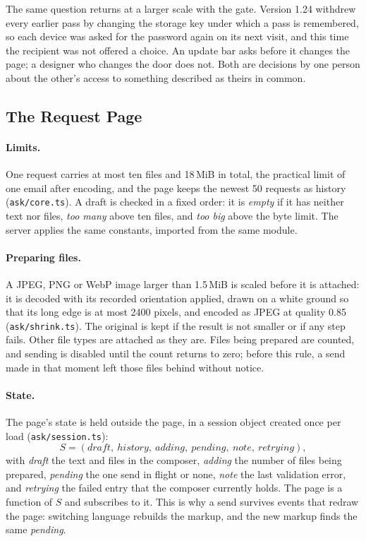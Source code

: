 \documentclass[sigconf,nonacm]{acmart}
\newcommand{\code}[1]{\textnormal{\texttt{\small #1}}}
\begin{document}
The same question returns at a larger scale with the gate. Version 1.24 withdrew every earlier
pass by changing the storage key under which a pass is remembered, so each device was asked
for the password again on its next visit, and this time the recipient was not offered a
choice. An update bar asks before it changes the page; a designer who changes the door does
not. Both are decisions by one person about the other's access to something described as
theirs in common.

\subsection{The Request Page}\label{sec:askpage}
\paragraph{Limits.}
One request carries at most ten files and 18\,MiB in total, the practical limit of one email
after encoding, and the page keeps the newest 50 requests as history
(\code{ask/core.ts}). A draft is checked in a fixed order: it is \emph{empty} if it has neither
text nor files, \emph{too many} above ten files, and \emph{too big} above the byte limit. The
server applies the same constants, imported from the same module.

\paragraph{Preparing files.}
A JPEG, PNG or WebP image larger than 1.5\,MiB is scaled before it is attached: it is decoded
with its recorded orientation applied, drawn on a white ground so that its long edge is at
most 2400 pixels, and encoded as JPEG at quality 0.85 (\code{ask/shrink.ts}). The original is
kept if the result is not smaller or if any step fails. Other file types are attached as they
are. Files being prepared are counted, and sending is disabled until the count returns to
zero; before this rule, a send made in that moment left those files behind without notice.

\paragraph{State.}
The page's state is held outside the page, in a session object created once per load
(\code{ask/session.ts}):
\begin{equation}\label{eq:askstate}
  S = (\mathit{draft},\ \mathit{history},\ \mathit{adding},\ \mathit{pending},\ \mathit{note},\
       \mathit{retrying}),
\end{equation}
with \emph{draft} the text and files in the composer, \emph{adding} the number of files being
prepared, \emph{pending} the one send in flight or none, \emph{note} the last validation
error, and \emph{retrying} the failed entry that the composer currently holds. The page is a
function of $S$ and subscribes to it. This is why a send survives events that redraw the page:
switching language rebuilds the markup, and the new markup finds the same \emph{pending}.
\end{document}
